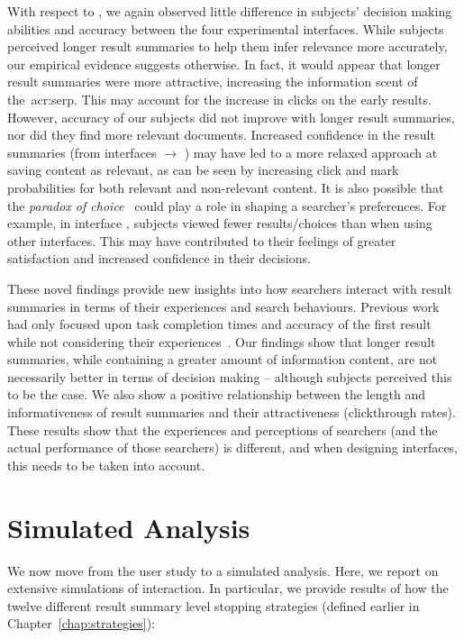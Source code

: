 With respect to , we again observed little difference in subjects' decision making abilities and accuracy between the four experimental interfaces. While subjects perceived longer result summaries to help them infer relevance more accurately, our empirical evidence suggests otherwise. In fact, it would appear that longer result summaries were more attractive, increasing the information scent of the~\gls{acr:serp}. This may account for the increase in clicks on the early results. However, accuracy of our subjects did not improve with longer result summaries, nor did they find more relevant documents. Increased confidence in the result summaries (from interfaces  $\rightarrow$ ) may have led to a more relaxed approach at saving content as relevant, as can be seen by increasing click and mark probabilities for both relevant and non-relevant content. It is also possible that the \emph{paradox of choice}~\citep{oulasvirta2009serp_size} could play a role in shaping a searcher's preferences. For example, in interface , subjects viewed fewer results/choices than when using other interfaces. This may have contributed to their feelings of greater satisfaction and increased confidence in their decisions.

These novel findings provide new insights into how searchers interact with result summaries in terms of their experiences and search behaviours. Previous work had only focused upon task completion times and accuracy of the first result while not considering their experiences~\citep{cutrell2007eye_tracking, kaisser2008improving}. Our findings show that longer result summaries, while containing a greater amount of information content, are not necessarily better in terms of decision making -- although subjects perceived this to be the case. We also show a positive relationship between the length and informativeness of result summaries and their attractiveness (clickthrough rates). These results show that the experiences and perceptions of searchers (and the actual performance of those searchers) is different, and when designing interfaces, this needs to be taken into account.

\section{Simulated Analysis}\label{sec:snippets:simulations}
We now move from the user study to a simulated analysis. Here, we report on extensive simulations of interaction. In particular, we provide results of how the twelve different result summary level stopping strategies (defined earlier in Chapter~\ref{chap:strategies}):

